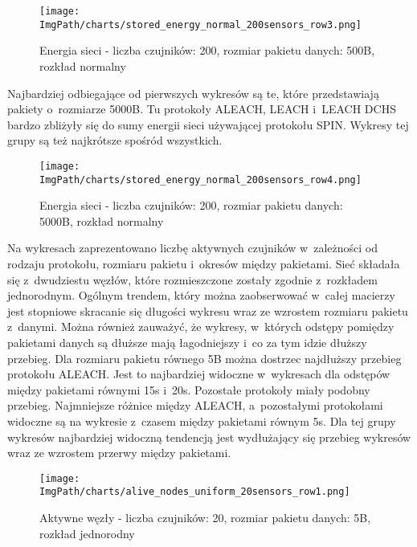 \begin{figure}[H]
	\begin{center}
		\texttt{[image: \\ImgPath/charts/stored\_energy\_normal\_200sensors\_row3.png]}
	\end{center}
	\caption{Energia sieci - liczba czujników: 200, rozmiar pakietu danych: 500B, rozkład normalny}
\end{figure}

Najbardziej odbiegające od pierwszych wykresów są te, które przedstawiają pakiety o~rozmiarze 5000B. Tu protokoły ALEACH, LEACH i~LEACH DCHS bardzo zbliżyły się do sumy energii sieci używającej protokołu SPIN. Wykresy tej grupy są też najkrótsze spośród wszystkich.

\begin{figure}[H]
	\begin{center}
		\texttt{[image: \\ImgPath/charts/stored\_energy\_normal\_200sensors\_row4.png]}
	\end{center}
	\caption{Energia sieci - liczba czujników: 200, rozmiar pakietu danych: 5000B, rozkład normalny}
\end{figure}

Na wykresach zaprezentowano liczbę aktywnych czujników w~zależności od rodzaju protokołu, rozmiaru pakietu i~okresów między pakietami. Sieć składała się z~dwudziestu węzłów, które rozmieszczone zostały zgodnie z~rozkładem jednorodnym.
Ogólnym trendem, który można zaobserwować w~całej macierzy jest stopniowe skracanie się długości wykresu wraz ze wzrostem rozmiaru pakietu z~danymi. Można również zauważyć, że wykresy, w~których odstępy pomiędzy pakietami danych są dłuższe mają łagodniejszy i~co za tym idzie dłuższy przebieg.
Dla rozmiaru pakietu równego 5B można dostrzec najdłuższy przebieg protokołu ALEACH. Jest to najbardziej widoczne w~wykresach dla odstępów między pakietami równymi 15s i~20s. Pozostałe protokoły miały podobny przebieg. Najmniejsze różnice między ALEACH, a~pozostałymi protokołami widoczne są na wykresie z~czasem między pakietami równym 5s. Dla tej grupy wykresów najbardziej widoczną tendencją jest wydłużający się przebieg wykresów wraz ze wzrostem przerwy między pakietami. 

\begin{figure}[H]
	\begin{center}
		\texttt{[image: \\ImgPath/charts/alive\_nodes\_uniform\_20sensors\_row1.png]}
	\end{center}
	\caption{Aktywne węzły - liczba czujników: 20, rozmiar pakietu danych: 5B, rozkład jednorodny}
\end{figure}

